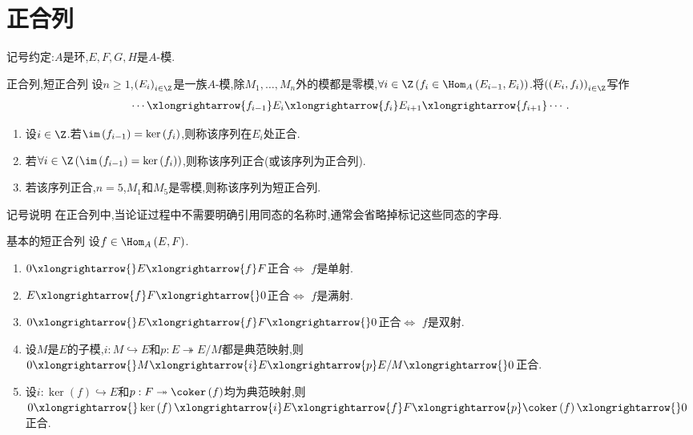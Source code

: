 \section{正合列}

记号约定:$A$是环,$E,F,G,H$是$A$-模.

\begin{definition}{正合列,短正合列}{}
	设$n\geq 1$,$\left(E_{i}\right)_{i\in\Z}$是一族$A$-模,除$M_{1},\ldots,M_{n}$外的模都是零模,$\forall i\in\Z\left(f_{i}\in\Hom_{A}\left(E_{i-1},E_{i}\right)\right)$.将$\left(\left(E_{i},f_{i}\right)\right)_{i\in\Z}$写作
	\begin{align*}
		\cdots\xlongrightarrow{f_{i-1}}E_{i}\xlongrightarrow{f_{i}}E_{i+1}\xlongrightarrow{f_{i+1}}\cdots.
	\end{align*}
	\begin{enumerate}
		\item 设$i\in\Z$.若$\im\left(f_{i-1}\right)=\ker\left(f_{i}\right)$,则称该序列在$E_{i}$处正合.
		\item 若$\forall i\in\Z\left(\im\left(f_{i-1}\right)=\ker\left(f_{i}\right)\right)$,则称该序列正合(或该序列为正合列).
		\item 若该序列正合,$n=5$,$M_{1}$和$M_{5}$是零模,则称该序列为短正合列.
	\end{enumerate}
\end{definition}

\begin{remark}{记号说明}{}
	在正合列中,当论证过程中不需要明确引用同态的名称时,通常会省略掉标记这些同态的字母.
\end{remark}

\begin{proposition}{基本的短正合列}{}
	设$f\in\Hom_{A}\left(E,F\right)$.
	\begin{enumerate}
		\item $0\xlongrightarrow{}E\xlongrightarrow{f}F$正合$\iff$ $f$是单射.
		\item $E\xlongrightarrow{f}F\xlongrightarrow{}0$正合$\iff$ $f$是满射.
		\item $0\xlongrightarrow{}E\xlongrightarrow{f}F\xlongrightarrow{}0$正合$\iff$ $f$是双射.
		\item 设$M$是$E$的子模,$i:M\hookrightarrow E$和$p:E\twoheadrightarrow E/M$都是典范映射,则$0\xlongrightarrow{}M\xlongrightarrow{i}E\xlongrightarrow{p}E/M\xlongrightarrow{}0$正合.
		\item 设$i:\ker\left(f\right)\hookrightarrow E$和$p:F\twoheadrightarrow\coker\left(f\right)$均为典范映射,则$0\xlongrightarrow{}\ker\left(f\right)\xlongrightarrow{i}E\xlongrightarrow{f}F\xlongrightarrow{p}\coker\left(f\right)\xlongrightarrow{}0$正合.
	\end{enumerate}
\end{proposition}

